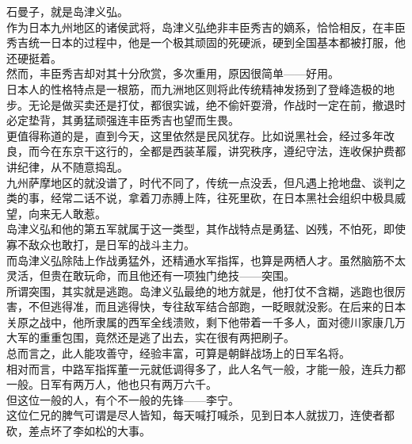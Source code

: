 \begin{multicols}{\theparacolNo}
石曼子，就是岛津义弘。\\

作为日本九州地区的诸侯武将，岛津义弘绝非丰臣秀吉的嫡系，恰恰相反，在丰臣秀吉统一日本的过程中，他是一个极其顽固的死硬派，硬到全国基本都被打服，他还硬挺着。\\

然而，丰臣秀吉却对其十分欣赏，多次重用，原因很简单——好用。\\

日本人的性格特点是一根筋，而九洲地区则将此传统精神发扬到了登峰造极的地步。无论是做买卖还是打仗，都很实诚，绝不偷奸耍滑，作战时一定在前，撤退时必定垫背，其勇猛顽强连丰臣秀吉也望而生畏。\\

更值得称道的是，直到今天，这里依然是民风犹存。比如说黑社会，经过多年改良，而今在东京干这行的，全都是西装革履，讲究秩序，遵纪守法，连收保护费都讲纪律，从不随意捣乱。\\

九州萨摩地区的就没谱了，时代不同了，传统一点没丢，但凡遇上抢地盘、谈判之类的事，经常二话不说，拿着刀赤膊上阵，往死里砍，在日本黑社会组织中极具威望，向来无人敢惹。\\

岛津义弘和他的第五军就属于这一类型，其作战特点是勇猛、凶残，不怕死，即使寡不敌众也敢打，是日军的战斗主力。\\

而岛津义弘除陆上作战勇猛外，还精通水军指挥，也算是两栖人才。虽然脑筋不太灵活，但贵在敢玩命，而且他还有一项独门绝技——突围。\\

所谓突围，其实就是逃跑。岛津义弘最绝的地方就是，他打仗不含糊，逃跑也很厉害，不但逃得准，而且逃得快，专往敌军结合部跑，一眨眼就没影。在后来的日本关原之战中，他所隶属的西军全线溃败，剩下他带着一千多人，面对德川家康几万大军的重重包围，竟然还是逃了出去，实在很有两把刷子。\\

总而言之，此人能攻善守，经验丰富，可算是朝鲜战场上的日军名将。\\

相对而言，中路军指挥董一元就低调得多了，此人名气一般，才能一般，连兵力都一般。日军有两万人，他也只有两万六千。\\

但这位一般的人，有个不一般的先锋——李宁。\\

这位仁兄的脾气可谓是尽人皆知，每天喊打喊杀，见到日本人就拔刀，连使者都砍，差点坏了李如松的大事。\\


\end{multicols}
